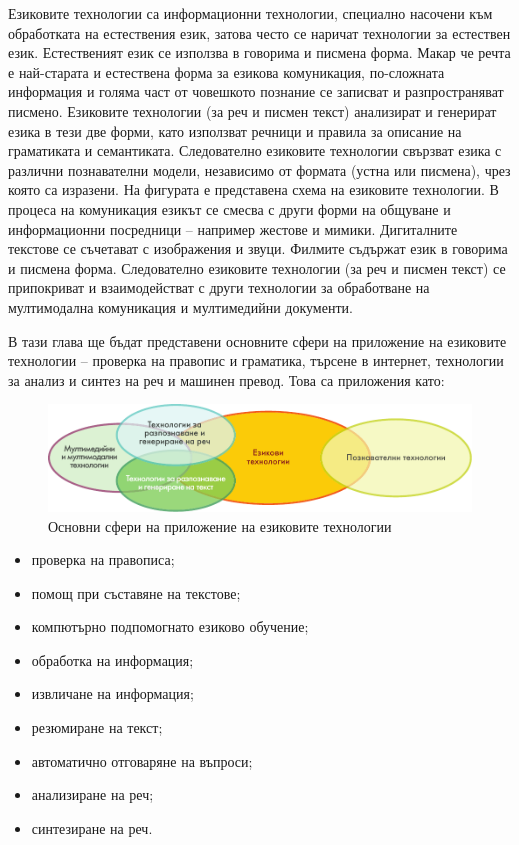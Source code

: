 \documentclass[]{../../metanetpaper}
\begin{document}
\begin{multicols}{2}

Езиковите технологии са информационни технологии, специално насочени към обработката на естествения език, затова често се наричат технологии за естествен език. Естественият език се използва в говорима и писмена форма. Макар че речта е най-старата и естествена форма за езикова комуникация, по-сложната информация и голяма част от човешкото познание се записват и разпространяват писмено. Езиковите технологии (за реч и писмен текст) анализират и генерират езика в тези две форми, като използват речници и правила за описание на граматиката и семантиката. Следователно езиковите технологии свързват езика с различни познавателни модели, независимо от формата (устна или писмена), чрез която са изразени.
На фигурата е представена схема на езиковите технологии. В процеса на комуникация езикът се смесва с други форми на общуване и информационни посредници -- например жестове и мимики. Дигиталните текстове се съчетават с изображения и звуци. Филмите съдържат език в говорима и писмена форма. Следователно езиковите технологии (за реч и писмен текст) се припокриват и взаимодействат с други технологии за  обработване на мултимодална комуникация и мултимедийни документи. 

В тази глава  ще бъдат представени основните сфери на приложение на
езиковите технологии -- проверка на правопис и граматика, търсене в
интернет, технологии за анализ и синтез на реч и машинен превод. Това
са приложения като: 

\begin{figure}[htb]
  \center
  \includegraphics[width=\textwidth]{../_media/bulgarian/language_technologies}
  \caption{Основни сфери на приложение на езиковите технологии}
  \label{fig:ltincontext_de}
\end{figure}

\begin{itemize}
\item проверка на правописа;
\item помощ при съставяне на текстове;
\item компютърно подпомогнато езиково обучение;
\item обработка на информация;
\item извличане на информация;
\item резюмиране на текст;
\item автоматично отговаряне на въпроси;
\item анализиране на реч;
\item синтезиране на реч.
\end{itemize}


\end{multicols}
\end{document}
